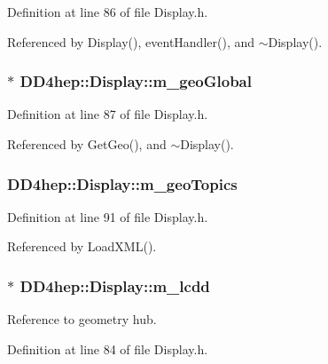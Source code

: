 Definition at line 86 of file Display.h.

Referenced by Display(), eventHandler(), and $\sim$Display().\hypertarget{class_d_d4hep_1_1_display_ad140be1ce0ad3e94e165623d66e16dca}{
\subsubsection[{m\_\-geoGlobal}]{$\ast$ {\bf DD4hep::Display::m\_\-geoGlobal}}}
\label{class_d_d4hep_1_1_display_ad140be1ce0ad3e94e165623d66e16dca}


Definition at line 87 of file Display.h.

Referenced by GetGeo(), and $\sim$Display().\hypertarget{class_d_d4hep_1_1_display_ade13a0eaa5fa83f5cf64f14ed7d3ef0d}{
\subsubsection[{m\_\-geoTopics}]{ {\bf DD4hep::Display::m\_\-geoTopics}}}
\label{class_d_d4hep_1_1_display_ade13a0eaa5fa83f5cf64f14ed7d3ef0d}


Definition at line 91 of file Display.h.

Referenced by LoadXML().\hypertarget{class_d_d4hep_1_1_display_a829bb86fd3460a74ca1da6c51e2802ef}{
\subsubsection[{m\_\-lcdd}]{$\ast$ {\bf DD4hep::Display::m\_\-lcdd}}}
\label{class_d_d4hep_1_1_display_a829bb86fd3460a74ca1da6c51e2802ef}


Reference to geometry hub. 

Definition at line 84 of file Display.h.

